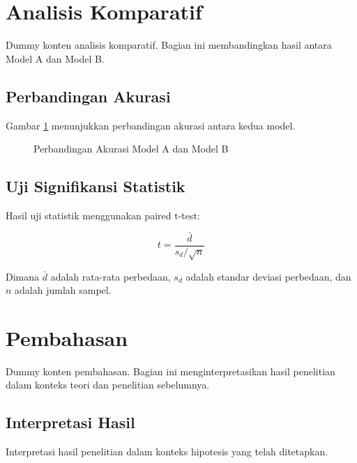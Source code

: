 \section{Analisis Komparatif}
\label{sec:analisis}

Dummy konten analisis komparatif. Bagian ini membandingkan hasil antara Model A dan Model B.

\subsection{Perbandingan Akurasi}
\label{subsec:perbandingan_akurasi}

Gambar \ref{fig:perbandingan} menunjukkan perbandingan akurasi antara kedua model.

\begin{figure}[h]
    \centering
    \caption{Perbandingan Akurasi Model A dan Model B}
    \label{fig:perbandingan}
\end{figure}

\subsection{Uji Signifikansi Statistik}
\label{subsec:uji_statistik}

Hasil uji statistik menggunakan paired t-test:

\begin{equation}
    t = \frac{\bar{d}}{s_d / \sqrt{n}}
    \label{eq:ttest}
\end{equation}

Dimana $\bar{d}$ adalah rata-rata perbedaan, $s_d$ adalah standar deviasi perbedaan, dan $n$ adalah jumlah sampel.

\section{Pembahasan}
\label{sec:pembahasan}

Dummy konten pembahasan. Bagian ini menginterpretasikan hasil penelitian dalam konteks teori dan penelitian sebelumnya.

\subsection{Interpretasi Hasil}
\label{subsec:interpretasi}

Interpretasi hasil penelitian dalam konteks hipotesis yang telah ditetapkan.

